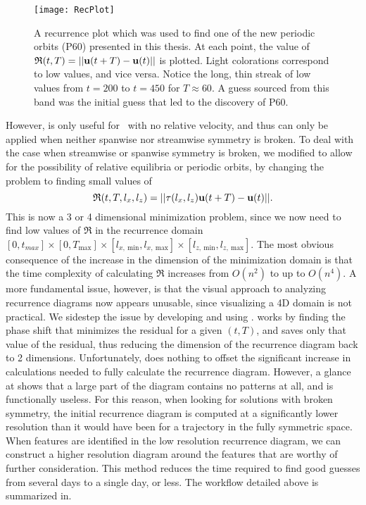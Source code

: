 \begin{figure}[h]
\texttt{[image: RecPlot]}
\caption{A recurrence plot which was used to find one of the new periodic orbits (P60) presented in this thesis. At each point, the value of  $\mathfrak{R}(t,T) = ||\mathbf{u}(t+T) - \mathbf{u}(t)||$ is plotted. Light colorations correspond to low values, and vice versa. Notice the long, thin streak of low values from $t = 200$ to $t = 450$  for $T \approx 60$. A guess sourced from this band was the initial guess that led to the discovery of P60.}\label{fig:recurrenceMinimum}
\end{figure}
 However,  is only useful for \ecs\ with no relative velocity, and thus can only be applied when neither spanwise nor streamwise symmetry is broken. To deal with the case when streamwise or spanwise symmetry is broken, we modified  to allow for the possibility of relative equilibria or periodic orbits, by changing the problem to finding small values of 
 \begin{equation}\label{eq:4DrecurrenceEQ}
 \mathfrak{R}(t,T,l_x,l_z) = ||\tau(l_x,l_z)\mathbf{u}(t+T) - \mathbf{u}(t)||.
  \end{equation}
 This is now a 3 or 4 dimensional minimization problem, since we now need to find low values of $\mathfrak{R}$ in the recurrence domain $[0,t_{max}]\times [0,T_{\textrm{max}}] \times [l_{x,~\textrm{min}},l_{x,~\textrm{max}}] \times [l_{z,~\textrm{min}},l_{z,~\textrm{max}}]$. The most obvious consequence of the increase in the dimension of the minimization domain is that the time complexity of calculating $\mathfrak{R}$ increases from $O(n^2)$ to up to $O(n^4)$. A more fundamental issue, however, is that the visual approach to analyzing recurrence diagrams  now appears unusable, since visualizing a 4D domain is not practical. We sidestep the issue by developing and using .  works by finding the phase shift that minimizes the residual for a given $(t,T)$, and saves only that value of the residual, thus reducing the dimension of the recurrence diagram back to 2 dimensions. Unfortunately,  does nothing to offset the significant increase in calculations needed to fully calculate the recurrence diagram. However, a glance at  shows that a large part of the diagram contains no patterns at all, and is functionally useless. For this reason, when looking for solutions with broken symmetry, the initial recurrence diagram is computed at a significantly lower resolution than it would have been for a trajectory in the fully symmetric space. When features are identified in the low resolution recurrence diagram, we can construct a higher resolution diagram around the features that are worthy of further consideration. This method reduces the time required to find good guesses from several days to a single day, or less. The workflow detailed above is summarized in. 

